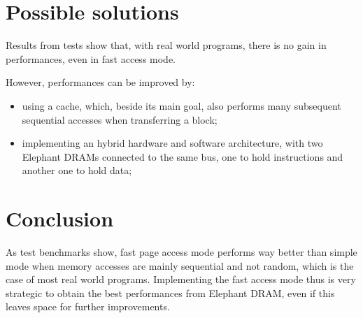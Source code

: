 \documentclass[a4paper,12pt]{article}
\newcommand{\memoryname}{Elephant}
\begin{document}






\section{Possible solutions}
Results from tests show that, with real world programs, there is no gain in performances, even in fast access mode.

However, performances can be improved by:

\begin{itemize}
  \item using a cache, which, beside its main goal, also performs many subsequent sequential accesses when transferring a block;
  \item implementing an hybrid hardware and software architecture, with two \memoryname{} DRAMs connected to the same bus, one to hold instructions and another one to hold data;
\end{itemize}

\section{Conclusion}
As test benchmarks show, fast page access mode performs way better than simple mode when memory accesses are mainly sequential and not random, which is the case of most real world programs.
Implementing the fast access mode thus is very strategic to obtain the best performances from \memoryname{} DRAM, even if this leaves space for further improvements.
\end{document}
